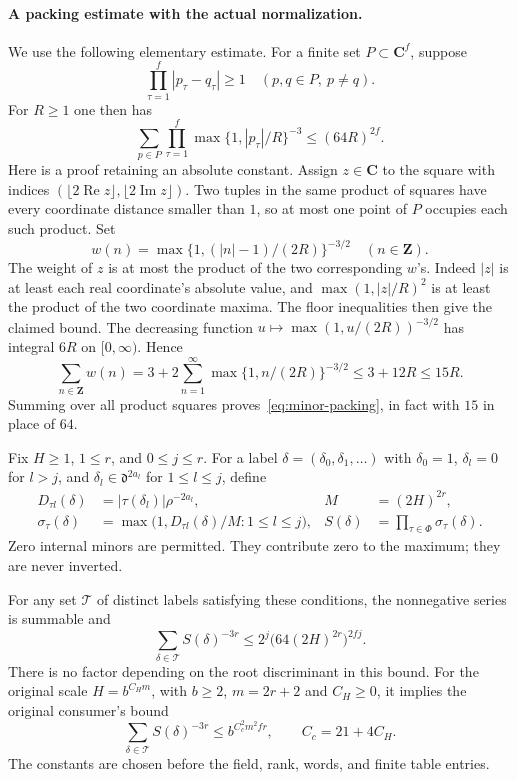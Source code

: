 \paragraph{A packing estimate with the actual normalization.}
We use the following elementary estimate.  For a finite set
$P\subset\mathbf C^f$, suppose
\[
 \prod_{\tau=1}^f|p_\tau-q_\tau|\ge1
       \quad(p,q\in P,\ p\ne q).
\]
For $R\ge1$ one then has
\begin{equation}\label{eq:minor-packing}
 \sum_{p\in P}\prod_{\tau=1}^f
        \max\{1,|p_\tau|/R\}^{-3}\le(64R)^{2f}.
\end{equation}
Here is a proof retaining an absolute constant.  Assign $z\in\mathbf C$
to the square with indices
$(\lfloor2\operatorname{Re}z\rfloor,
  \lfloor2\operatorname{Im}z\rfloor)$.
Two tuples in the same product of squares have every coordinate
distance smaller than $1$, so at most one point of $P$ occupies
each such product.  Set
\[
 w(n)=\max\{1,(|n|-1)/(2R)\}^{-3/2}\quad(n\in\mathbf Z).
\]
The weight of $z$ is at most the product of the two corresponding
$w$'s.  Indeed $|z|$ is at least each real coordinate's absolute
value, and
$\max(1,|z|/R)^2$ is at least the product of the two coordinate
maxima.  The floor inequalities then give the claimed bound.
The decreasing function $u\mapsto\max(1,u/(2R))^{-3/2}$ has
integral $6R$ on $[0,\infty)$.  Hence
\[
 \sum_{n\in\mathbf Z}w(n)
 =3+2\sum_{n=1}^{\infty}\max\{1,n/(2R)\}^{-3/2}
 \le3+12R\le15R.
\]
Summing over all product squares proves~\eqref{eq:minor-packing},
in fact with $15$ in place of $64$.

Fix $H\ge1$, $1\le r$, and $0\le j\le r$.  For a label
$\delta=(\delta_0,\delta_1,\ldots)$ with
$\delta_0=1$, $\delta_l=0$ for $l>j$, and
$\delta_l\in\mathfrak d^{2a_l}$ for $1\le l\le j$, define
\begin{align*}
 D_{\tau l}(\delta)&=|\tau(\delta_l)|\rho^{-2a_l},&
 M&=(2H)^{2r},\\
 \sigma_\tau(\delta)&=
    \max\bigl(1,D_{\tau l}(\delta)/M:1\le l\le j\bigr),&
 S(\delta)&=\prod_{\tau\in\Phi}\sigma_\tau(\delta).
\end{align*}
Zero internal minors are permitted.  They contribute zero to the
maximum; they are never inverted.

\begin{theorem}
\label{thm:actual-normalized-minor-sum}
For any set $\mathcal T$ of distinct labels satisfying these
conditions, the nonnegative series is summable and
\begin{equation}\label{eq:normalized-label-sum}
 \sum_{\delta\in\mathcal T}S(\delta)^{-3r}
       \le2^j\bigl(64(2H)^{2r}\bigr)^{2fj}.
\end{equation}
There is no factor depending on the root discriminant in this
bound.  For the original scale $H=b^{C_Hm}$, with $b\ge2$,
$m=2r+2$ and $C_H\ge0$, it implies the original consumer's bound
\begin{equation}\label{eq:original-minor-label-budget}
 \sum_{\delta\in\mathcal T}S(\delta)^{-3r}
     \le b^{C_c^2m^2fr},\qquad C_c=21+4C_H.
\end{equation}
The constants are chosen before the field, rank, words, and finite
table entries.
\end{theorem}

